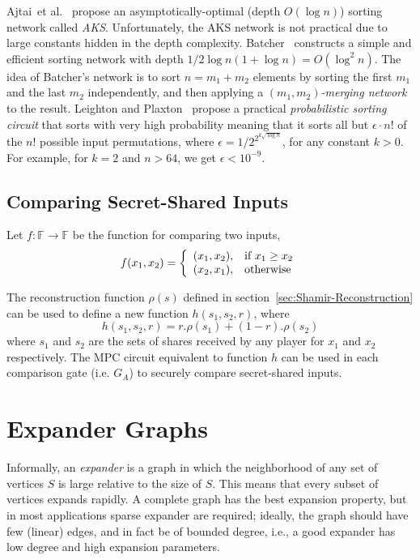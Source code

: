 \documentclass[10pt]{article}
\theoremstyle{plain}
\begin{document}
Ajtai~et al.~\cite{Ajtai:1983:SCL:61981.61982} propose an asymptotically-optimal
(depth $O(\log n)$) sorting network called \emph{AKS}. Unfortunately,
the AKS network is not practical due to large constants hidden in
the depth complexity. Batcher~\cite{Batcher:1968:SNA:1468075.1468121}
constructs a simple and efficient sorting network with depth $1/2\log n(1+\log n)=O(\log^{2}n)$.
The idea of Batcher's network is to sort $n=m_{1}+m_{2}$ elements
by sorting the first $m_{1}$ and the last $m_{2}$ independently,
and then applying a $(m_{1},m_{2})$\emph{-merging network} to the
result. Leighton and Plaxton~\cite{Leighton:1990:Sorting} propose
a practical \emph{probabilistic sorting circuit} that sorts with very
high probability meaning that it sorts all but $\epsilon\cdot n!$
of the $n!$ possible input permutations, where $\epsilon=1/2^{2^{k\sqrt{\log n}}}$,
for any constant $k>0$. For example, for $k=2$ and $n>64$, we get
$\epsilon<10^{-9}$.%

\subsection{Comparing Secret-Shared Inputs}

Let $f:\mathbb{F}\to\mathbb{F}$ be the function for comparing two
inputs, 
\[
f(x_{1},x_{2})=\left\{ \begin{array}{ll}
(x_{1},x_{2}), & \text{if \ensuremath{x_{1}\geq x_{2}}}\\
(x_{2},x_{1}), & \text{otherwise}
\end{array}\right.
\]

The reconstruction function $\rho(s)$ defined in section~\ref{sec:Shamir-Reconstruction}
can be used to define a new function $h(s_{1},s_{2},r)$, where 
\[
h(s_{1},s_{2},r)=r.\rho(s_{1})+(1-r).\rho(s_{2})
\]
where $s_{1}$ and $s_{2}$ are the sets of shares received by any
player for $x_{1}$ and $x_{2}$ respectively. The MPC circuit equivalent
to function $h$ can be used in each comparison gate (i.e. $G_{A}$)
to securely compare secret-shared inputs.


\section{Expander Graphs}

Informally, an \emph{expander} is a graph in which the neighborhood
of any set of vertices $S$ is large relative to the size of $S$.
This means that every subset of vertices expands rapidly. A complete
graph has the best expansion property, but in most applications sparse
expander are required; ideally, the graph should have few (linear)
edges, and in fact be of bounded degree, i.e., a good expander has
low degree and high expansion parameters. 
\end{document}
